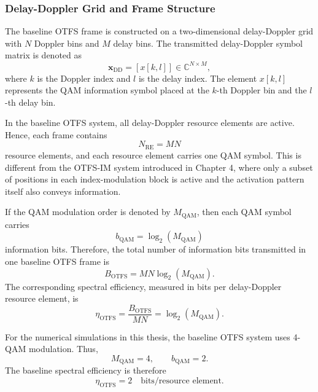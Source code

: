 \subsubsection{Delay-Doppler Grid and Frame Structure}

The baseline OTFS frame is constructed on a two-dimensional delay-Doppler grid with \(N\) Doppler bins and \(M\) delay bins. The transmitted delay-Doppler symbol matrix is denoted as
\begin{equation}
    \mathbf{x}_{\mathrm{DD}}
    =
    [x[k,l]]
    \in \mathbb{C}^{N \times M},
\end{equation}
where \(k\) is the Doppler index and \(l\) is the delay index. The element \(x[k,l]\) represents the QAM information symbol placed at the \(k\)-th Doppler bin and the \(l\)-th delay bin.

In the baseline OTFS system, all delay-Doppler resource elements are active. Hence, each frame contains
\begin{equation}
    N_{\mathrm{RE}} = MN
\end{equation}
resource elements, and each resource element carries one QAM symbol. This is different from the OTFS-IM system introduced in Chapter 4, where only a subset of positions in each index-modulation block is active and the activation pattern itself also conveys information.

If the QAM modulation order is denoted by \(M_{\mathrm{QAM}}\), then each QAM symbol carries
\begin{equation}
    b_{\mathrm{QAM}} = \log_2(M_{\mathrm{QAM}})
\end{equation}
information bits. Therefore, the total number of information bits transmitted in one baseline OTFS frame is
\begin{equation}
    B_{\mathrm{OTFS}} = MN \log_2(M_{\mathrm{QAM}}).
\end{equation}
The corresponding spectral efficiency, measured in bits per delay-Doppler resource element, is
\begin{equation}
    \eta_{\mathrm{OTFS}}
    =
    \frac{B_{\mathrm{OTFS}}}{MN}
    =
    \log_2(M_{\mathrm{QAM}}).
\end{equation}

For the numerical simulations in this thesis, the baseline OTFS system uses 4-QAM modulation. Thus,
\begin{equation}
    M_{\mathrm{QAM}} = 4,
    \qquad
    b_{\mathrm{QAM}} = 2.
\end{equation}
The baseline spectral efficiency is therefore
\begin{equation}
    \eta_{\mathrm{OTFS}} = 2
    \quad \text{bits/resource element}.
\end{equation}

